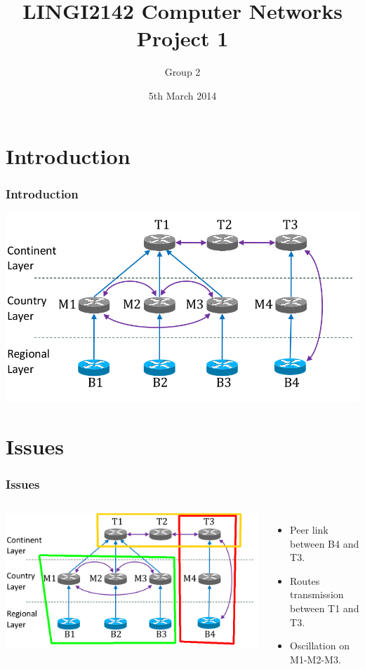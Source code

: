 \documentclass[handout,usenames,dvipsnames]{beamer}
\title[LINGI2142 Project 1]{LINGI2142 Computer Networks \\ Project 1} %
\author[Group 2] {Group 2} %
\institute[INGI] %
{
Université Catholique de Louvain - INGI\\ %
\medskip
}
\date{5th March 2014} %
\begin{document}
\begin{frame}
\titlepage %
\end{frame}

\section{Introduction}
\begin{frame}
\frametitle{Introduction}
\includegraphics[scale=0.35]{bgg-sessions.png}
\end{frame}

\section{Issues}
\begin{frame}
\frametitle{Issues}
\begin{columns}[cc]
\includegraphics[width=1.3\textwidth]{issues.png}

\begin{itemize}
	\item Peer link between B4 and T3.
	\item Routes transmission between T1 and T3.
	\item Oscillation on M1-M2-M3.
\end{itemize}
\end{columns}
\end{frame}
\end{document}
